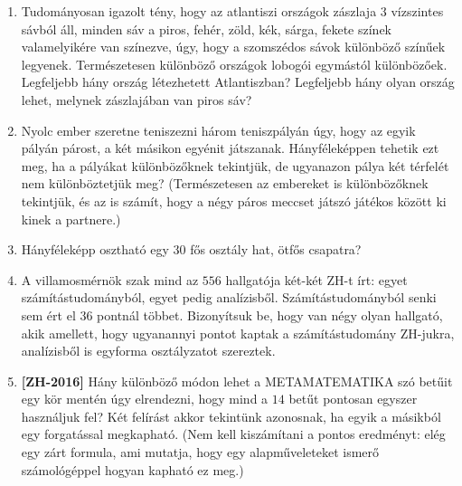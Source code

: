 \documentclass[a4paper,12pt]{article}
\begin{document}
\begin{enumerate}
        \item
        Tudományosan igazolt tény, hogy az atlantiszi országok zászlaja $3$
        vízszintes sávból áll, minden sáv a piros, fehér, zöld, kék, sárga, fekete
        színek valamelyikére van színezve, úgy, hogy a szomszédos sávok különböző
        színűek legyenek. Természetesen különböző országok lobogói egymástól
        különbözőek. Legfeljebb hány ország létezhetett Atlantiszban?  Legfeljebb
        hány olyan ország lehet, melynek zászlajában van piros sáv?

        \item
        Nyolc ember szeretne teniszezni három teniszpályán úgy, hogy az egyik
        pályán párost, a két másikon egyénit játszanak. Hányféleképpen tehetik ezt
        meg, ha a pályákat különbözőknek tekintjük, de ugyanazon pálya két
        térfelét nem különböztetjük meg? (Természetesen az embereket is
        különbözőknek tekintjük, és az is számít, hogy a négy páros meccset játszó
        játékos között ki kinek a partnere.)

        \item
        Hányféleképp osztható egy $30$ fős osztály hat, ötfős
        csapatra?

        \item
        A villamosmérnök szak mind az $556$ hallgatója két-két ZH-t írt: egyet
        számítástudományból, egyet pedig analízisből. Számítástudományból senki sem
        ért el $36$ pontnál többet. Bizonyítsuk be, hogy van négy olyan hallgató,
        akik amellett, hogy ugyanannyi pontot kaptak a számítástudomány ZH-jukra,
        analízisből is egyforma osztályzatot szereztek.

        \item \textbf{[ZH-2016]}
        Hány különböző módon lehet
        a METAMATEMATIKA szó betűit egy kör mentén úgy elrendezni, hogy mind a $14$
        betűt pontosan egyszer használjuk fel? Két felírást akkor tekintünk
        azonosnak, ha egyik a másikból egy forgatással megkapható.
        (Nem kell kiszámítani a pontos eredményt: elég egy zárt formula,
        ami mutatja, hogy egy alapműveleteket ismerő számológéppel hogyan
        kapható ez meg.)



\end{enumerate}
\end{document}
